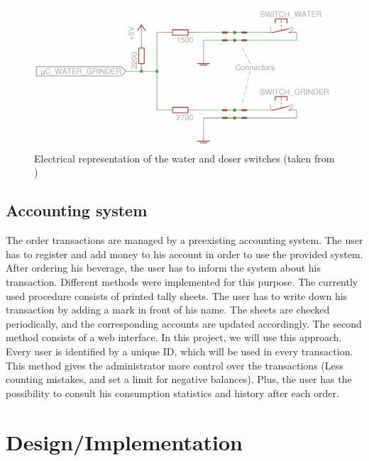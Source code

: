 \documentclass[12pt]{article}
\begin{document}
 
  
   \begin{figure}[H]
   \centering
   \includegraphics[width=14cm]{./images/waterDoser}
   \captionsetup{justification=centering}
   \caption{Electrical representation of the water and doser switches (taken from \cite{BachelorThesis})}
   \label{fig:waterDoser}
  \end{figure}
  
  \subsection{Accounting system}
  The order transactions are managed by a preexisting accounting system. 
  The user has to register and add money to his account in order to use the provided system. 
  After ordering his beverage, the user has to inform the system about his transaction. 
  Different methods were implemented for this purpose. The currently used procedure consists of printed tally sheets.
  The user has to write down his transaction by adding a mark in front of his name. 
  The sheets are checked periodically, and the corresponding accounts are updated accordingly. 
  The second method consists of a web interface. In this project, we will use this approach.
  Every user is identified by a unique ID, which will be used in every transaction. 
  This method gives the administrator more control over the transactions (Less counting mistakes, and set a limit for negative balances).
  Plus, the user has the possibility to consult his consumption statistics and history after each order.

  \pagebreak
  
  \section{Design/Implementation}
  
\end{document}
